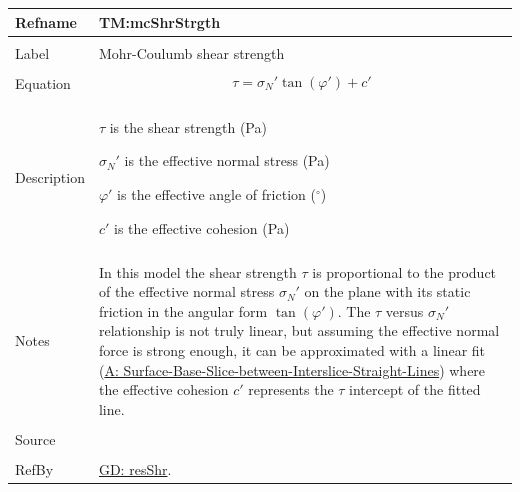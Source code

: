\documentclass[12pt]{article}
\begin{document}
\noindent \begin{minipage}{\textwidth}
\begin{tabular}{p{} p{}}
\toprule \textbf{Refname} & \textbf{TM:mcShrStrgth}
\label{TM:mcShrStrgth}
\\ \midrule \\
Label & Mohr-Coulumb shear strength
        \\ \midrule \\
        Equation & \begin{displaymath}
                   τ={σ_{N}}' \tan\left(φ'\right)+c'
                   \end{displaymath}
                   \\ \midrule \\
                   Description & \begin{symbDescription}
                                 \item{$τ$ is the shear strength (Pa)}
                                 \item{${σ_{N}}'$ is the effective normal stress (Pa)}
                                 \item{$φ'$ is the effective angle of friction (${}^{\circ}$)}
                                 \item{$c'$ is the effective cohesion (Pa)}
                                 \end{symbDescription}
                                 \\ \midrule \\
                                 Notes & In this model the shear strength $τ$ is proportional to the product of the effective normal stress ${σ_{N}}'$ on the plane with its static friction in the angular form $\tan\left(φ'\right)$. The $τ$ versus ${σ_{N}}'$ relationship is not truly linear, but assuming the effective normal force is strong enough, it can be approximated with a linear fit (\hyperref[assumpSBSBISL]{A: Surface-Base-Slice-between-Interslice-Straight-Lines}) where the effective cohesion $c'$ represents the $τ$ intercept of the fitted line.
                                         \\ \midrule \\
                                         Source & \cite{fredlund1977}
                                                  \\ \midrule \\
                                                  RefBy & \hyperref[GD:resShr]{GD: resShr}.
\\ \bottomrule \end{tabular}
\end{minipage}
\par~
\end{document}
